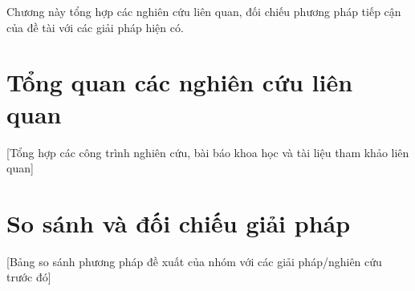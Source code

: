 Chương này tổng hợp các nghiên cứu liên quan, đối chiếu phương pháp tiếp cận của đề tài với các giải pháp hiện có.

\section{Tổng quan các nghiên cứu liên quan}
[Tổng hợp các công trình nghiên cứu, bài báo khoa học và tài liệu tham khảo liên quan]

\section{So sánh và đối chiếu giải pháp}
[Bảng so sánh phương pháp đề xuất của nhóm với các giải pháp/nghiên cứu trước đó]

